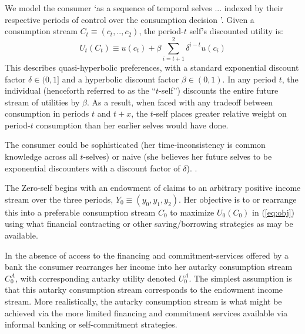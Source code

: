 \documentclass[11pt,english]{article}
\theoremstyle{plain}
\theoremstyle{definition}
\begin{document}
We model the consumer `as a sequence of temporal selves ... indexed by their respective periods of control over the consumption decision \citet[][p.451]{laibson1997}'. Given a consumption stream $C_{t}\equiv\left(c_{t},..,c_{2}\right)$,
the period-$t$ self's discounted utility is: 
\begin{equation}
U_{t}\left(C_{t}\right)\equiv u\left(c_{t}\right)+\beta\sum\limits _{i=t+1}^{2}\delta^{i-t}u\left(c_{i}\right)\label{eq:obj}
\end{equation}
This describes quasi-hyperbolic preferences, with a standard exponential
discount factor $\delta\in(0,1]$ and a hyperbolic discount factor
$\beta\in(0,1)$. In any period $t$, the individual (henceforth referred
to as the ``$t$-self'') discounts the entire future stream of utilities
by $\beta$. As a result, when faced with any tradeoff between consumption
in periods $t$ and $t+x$, the $t$-self places greater relative
weight on period-$t$ consumption than her earlier selves would have done. 

The consumer could be sophisticated (her time-inconsistency is common
knowledge across all $t$-selves) or naive (she believes her future
selves to be exponential discounters with a discount factor of $\delta$).
\citep{odonoghue2001}.

The Zero-self begins with an endowment of claims to an arbitrary positive
income stream over the three periods, $Y_{0}\equiv\left(y_{0},y_{1},y_{2}\right)$.
Her objective is to or rearrange this into a preferable consumption stream
$C_{0}$ to maximize $U_{0}(C_{0})$ in (\ref{eq:obj}) using what
financial contracting or other saving/borrowing strategies as may be available.

In the absence of access to the financing and commitment-services offered by a bank the consumer rearranges her income
into her autarky consumption stream $C_{0}^{A}$, with corresponding
autarky utility denoted $U_{0}^{A}$. The simplest assumption is that this autarky consumption stream corresponds to  the endowment income stream. More realistically,  the autarky consumption stream is what might be achieved via the more limited financing and commitment services available via informal banking or self-commitment strategies.  
\end{document}
